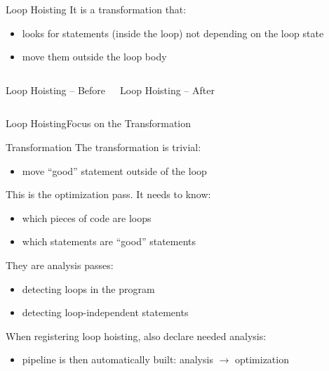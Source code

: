 \documentclass[10pt,mathserif]{beamer}
\newcommand{\cinput}[1]{}
\begin{document}
\begin{frame}{Loop Hoisting}
	It is a transformation that:
	\begin{itemize}
		\item looks for statements (inside the loop) not depending on the loop state
		\item move them outside the loop body
	\end{itemize}
	
	\begin{columns}[t]
		\begin{block}{Loop Hoisting -- Before}
			\centering
			\cinput{snippet/01/loop-hoisting-before.c}
		\end{block}
		
		\begin{block}{Loop Hoisting -- After}
			\centering
			\cinput{snippet/01/loop-hoisting-after.c}
		\end{block}
	\end{columns}
\end{frame}


\begin{frame}{Loop Hoisting}{Focus on the Transformation}
	
	\begin{block}{Transformation}
	The transformation is trivial:
	\begin{itemize}
		\item move ``good'' statement outside of the loop
	\end{itemize}
	\end{block}
	
	This is the \alert{optimization pass}. It needs to know:
	
	\begin{itemize}
		\item which pieces of code are loops
		\item which statements are ``good'' statements
	\end{itemize}
	
	They are \alert{analysis} passes:
	
	\begin{itemize}
		\item detecting loops in the program
		\item detecting loop-independent statements
	\end{itemize}
	
	When registering loop hoisting, also declare needed analysis:
	
	\begin{itemize}
		\item pipeline is then automatically built: analysis $\rightarrow$ optimization
	\end{itemize}
\end{frame}
\end{document}
